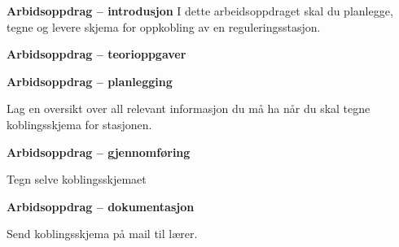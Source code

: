 

\noindent

\vskip 5pt


\textbf{Arbidsoppdrag -- introdusjon}
I dette arbeidsoppdraget skal du planlegge, tegne og levere skjema for oppkobling av en reguleringsstasjon.

\textbf{Arbidsoppdrag -- teorioppgaver}

\textbf{Arbidsoppdrag -- planlegging}

Lag en oversikt over all relevant informasjon du må ha når du skal tegne koblingsskjema for stasjonen. 

\textbf{Arbidsoppdrag -- gjennomføring}

Tegn selve koblingsskjemaet

\textbf{Arbidsoppdrag -- dokumentasjon}

Send koblingsskjema på mail til lærer. 

















\vfil \eject

















